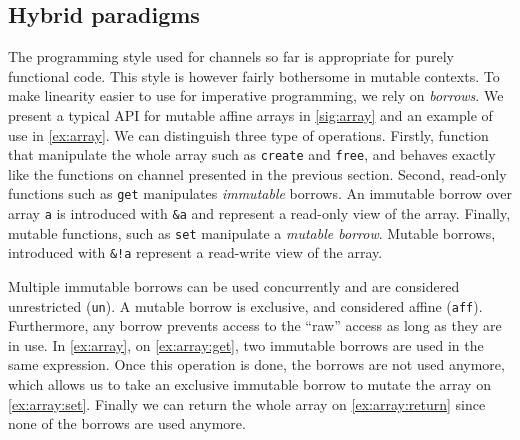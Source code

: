
\subsection{Hybrid paradigms}

The programming style used for channels so far is
appropriate for purely functional code.
This style is however fairly bothersome in mutable contexts.
%
To make linearity easier to use for imperative programming, we rely on
{\em borrows}. We present a typical API for mutable affine arrays
in \cref{sig:array} and an example of use in \cref{ex:array}.
We can distinguish three type of operations. Firstly,
function that manipulate the whole
array such as \lstinline/create/ and \lstinline/free/, and behaves exactly
like the functions on channel presented in the previous section.
Second, read-only functions such as \lstinline/get/
manipulates \emph{immutable} borrows. An immutable borrow over array \lstinline/a/
is introduced with \lstinline/&a/ and represent a read-only view of the array.
Finally, mutable functions, such as \lstinline/set/ manipulate
a \emph{mutable borrow}. Mutable borrows, introduced with \lstinline/&!a/
represent a read-write view of the array.

Multiple immutable borrows can be used concurrently and are considered
unrestricted (\lstinline/un/).
A mutable borrow is exclusive, and considered affine (\lstinline/aff/).
Furthermore, any borrow prevents access to the ``raw'' access
as long as they are in use. In \cref{ex:array}, on \cref{ex:array:get},
two immutable borrows are used in the same expression. Once this operation
is done, the borrows are not used anymore, which allows us to take
an exclusive immutable borrow to mutate the array on \cref{ex:array:set}.
Finally we can return the whole array on \cref{ex:array:return} since
none of the borrows are used anymore.

